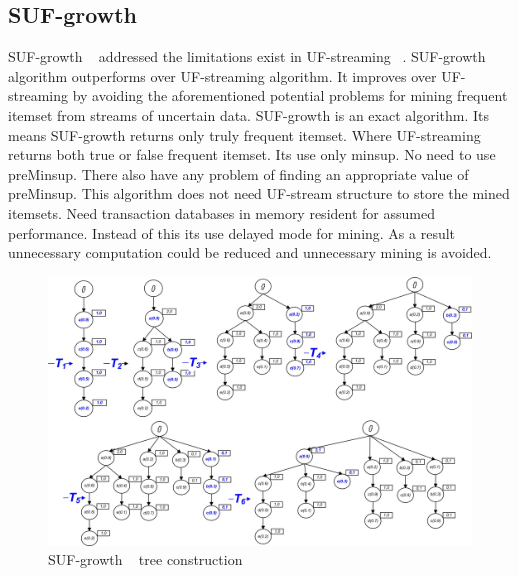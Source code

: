 	\subsection{SUF-growth}
	SUF-growth ~\cite{suf_growth} addressed the limitations exist in UF-streaming ~\cite{suf_growth}. SUF-growth algorithm outperforms over UF-streaming algorithm. It improves over UF-streaming by avoiding the aforementioned potential problems for mining frequent itemset from streams of uncertain data. SUF-growth is an exact algorithm. Its means SUF-growth returns only truly frequent itemset. Where UF-streaming returns both true or false frequent itemset. Its use only minsup. No need to use preMinsup. There also have any problem of finding an appropriate value of preMinsup. This algorithm does not need UF-stream structure to store the mined itemsets. Need transaction databases in memory resident for assumed performance. Instead of this its use delayed mode for mining. As a result unnecessary computation could be reduced and unnecessary mining is avoided.
		\begin{figure}[]
		\centering
			\includegraphics[width=1\textwidth]{../images/suf_simulation}
		\caption{SUF-growth ~\cite{suf_growth} tree construction}
		\label{figure:suf_simulation}
		\end{figure}
